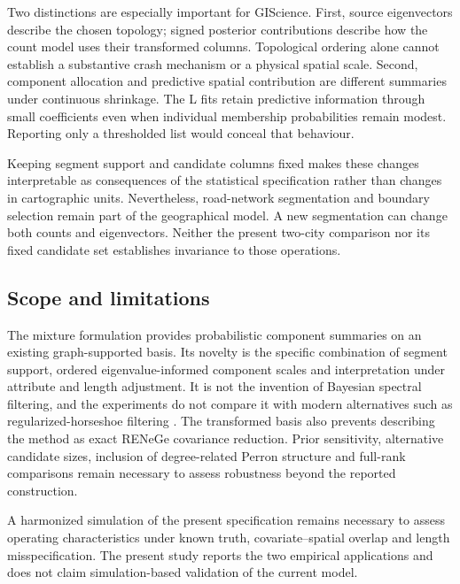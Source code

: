 \documentclass[11pt]{article}
\begin{document}
Two distinctions are especially important for GIScience. First, source eigenvectors describe the chosen topology; signed posterior contributions describe how the count model uses their transformed columns. Topological ordering alone cannot establish a substantive crash mechanism or a physical spatial scale. Second, component allocation and predictive spatial contribution are different summaries under continuous shrinkage. The L fits retain predictive information through small coefficients even when individual membership probabilities remain modest. Reporting only a thresholded list would conceal that behaviour.

Keeping segment support and candidate columns fixed makes these changes interpretable as consequences of the statistical specification rather than changes in cartographic units. Nevertheless, road-network segmentation and boundary selection remain part of the geographical model. A new segmentation can change both counts and eigenvectors. Neither the present two-city comparison nor its fixed candidate set establishes invariance to those operations.

\subsection{Scope and limitations}
The mixture formulation provides probabilistic component summaries on an existing graph-supported basis. Its novelty is the specific combination of segment support, ordered eigenvalue-informed component scales and interpretation under attribute and length adjustment. It is not the invention of Bayesian spectral filtering, and the experiments do not compare it with modern alternatives such as regularized-horseshoe filtering \citep{donegan2020}. The transformed basis also prevents describing the method as exact RENeGe covariance reduction. Prior sensitivity, alternative candidate sizes, inclusion of degree-related Perron structure and full-rank comparisons remain necessary to assess robustness beyond the reported construction.

A harmonized simulation of the present specification remains necessary to assess operating characteristics under known truth, covariate--spatial overlap and length misspecification. The present study reports the two empirical applications and does not claim simulation-based validation of the current model.
\end{document}
